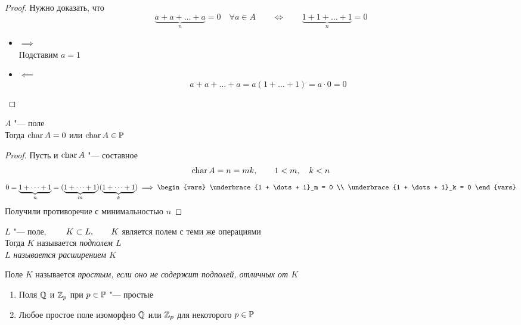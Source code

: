 \begin{proof}
	Нужно доказать, что
	$$ \underbrace{a + a + \dots + a}_n = 0 \quad \forall a \in A \qquad \iff \qquad \underbrace{1 + 1 + \dots + 1}_n = 0 $$
	\begin{itemize}
		\item $ \implies $ \\
		Подставим $ a = 1 $
		\item $ \impliedby $
		$$ a + a + \dots + a = a(1 + \dots + 1) = a \cdot 0 = 0 $$
	\end{itemize}
\end{proof}

\begin{property}
	$ A $ "--- поле \\
	Тогда $ \operatorname{char} A = 0 $ или $ \operatorname{char} A \in \mathbb{P} $
\end{property}

\begin{proof}
	Пусть  и $ \operatorname{char} A $ "--- составное
	$$ \operatorname{char} A = n = mk, \qquad 1 < m, \quad k < n $$
	$$ 0 = \underbrace{1 + \dots + 1}_n = (\underbrace{1 + \dots + 1}_m)(\underbrace{1 + \dots + 1}_k) \implies
	\begin{vars}
		\underbrace{1 + \dots + 1}_m = 0 \\
		\underbrace{1 + \dots + 1}_k = 0
	\end{vars} $$
	Получили противоречие с минимальностью $ n $
\end{proof}

\begin{definition}
	$ L $ "--- поле, $ \qquad K \subset L, \qquad K $ является полем с теми же операциями \\
	Тогда $ K $ называется \it{подполем} $ L $ \\
	$ L $ называется \it{расширением} $ K $
\end{definition}

\begin{definition}
	Поле $ K $ называется \it{простым}, если оно не содержит подполей, отличных от $ K $
\end{definition}

\begin{theorem}
	\hfill
	\begin{enumerate}
		\item Поля $ \mathbb{Q} $ и $ \mathbb{Z}_p $ при $ p \in \mathbb{P} $ "--- простые

		\item Любое простое поле изоморфно $ \mathbb{Q} $ или $ \mathbb{Z}_p $ для некоторого $ p \in \mathbb{P} $
	\end{enumerate}
\end{theorem}

